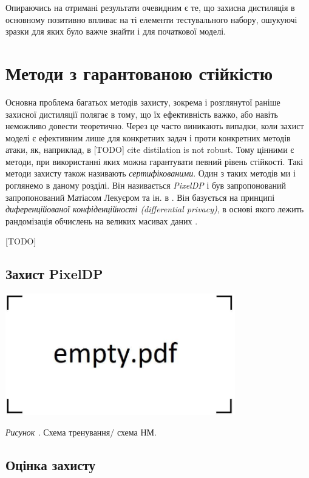 \documentclass[14pt,a4paper]{extarticle}
\newcounter{e}
\newcounter{pic}
\newcommand{\pic}[1]{\refstepcounter{pic} \vspace{-0.3cm}\textit{Рисунок \arabic{pic}\label{#1}.}}
\numberwithin{equation}{section}
\numberwithin{figure}{section}
\begin{document}
 Опираючись на отримані результати очевидним є те, що захисна дистиляція в основному позитивно впливає на ті елементи тестувального набору, ошукуючі зразки для яких було важче знайти і для початкової моделі.
 
 \newpage
 \thispagestyle{empty}
 \section{Методи з гарантованою стійкістю}
 Основна проблема багатьох методів захисту, зокрема і розглянутої раніше захисної дистиляції полягає в тому, що їх ефективність важко, або навіть неможливо довести теоретично. Через це часто виникають випадки, коли захист моделі є ефективним лише для конкретних задач і проти конкретних методів атаки,
 як, наприклад, в [TODO] cite distilation is not robust. Тому цінними є методи, при використанні яких можна гарантувати певний рівень стійкості. Такі методи захисту також називають \textit{сертифікованими}. Один з таких методів ми і роглянемо в даному розділі. Він називається \textit{PixelDP} і був запропонований  запропонований Матіасом Лекуєром та ін. в \cite{pixeldp}. Він базується на принципі \textit{диференційованої конфіденційності (differential privacy)}, в основі якого лежить рандомізація обчислень на великих масивах даних \cite{differential-privacy}.
 
 [TODO]
 \subsection{Захист PixelDP}
 
 \begin{center}
 	\includegraphics[width=10cm]{../images/empty.pdf}
 \end{center}
 \begin{center}
 	\pic{distilation} Схема тренування/ схема НМ.
 \end{center}
 
 
 \subsection{Оцінка захисту}
 
\end{document}
